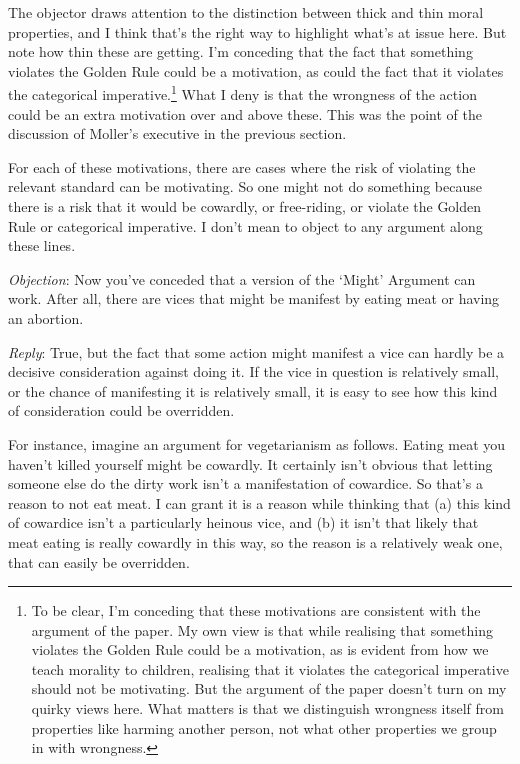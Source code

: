 \documentclass[
  10pt,
  letterpaper,
  DIV=11,
  numbers=noendperiod,
  twoside]{scrartcl}
\begin{document}
The objector draws attention to the distinction between thick and thin
moral properties, and I think that's the right way to highlight what's
at issue here. But note how thin these are getting. I'm conceding that
the fact that something violates the Golden Rule could be a motivation,
as could the fact that it violates the categorical
imperative.\footnote{To be clear, I'm conceding that these motivations
  are consistent with the argument of the paper. My own view is that
  while realising that something violates the Golden Rule could be a
  motivation, as is evident from how we teach morality to children,
  realising that it violates the categorical imperative should not be
  motivating. But the argument of the paper doesn't turn on my quirky
  views here. What matters is that we distinguish wrongness itself from
  properties like harming another person, not what other properties we
  group in with wrongness.} What I deny is that the wrongness of the
action could be an extra motivation over and above these. This was the
point of the discussion of Moller's executive in the previous section.

For each of these motivations, there are cases where the risk of
violating the relevant standard can be motivating. So one might not do
something because there is a risk that it would be cowardly, or
free-riding, or violate the Golden Rule or categorical imperative. I
don't mean to object to any argument along these lines.

\emph{Objection}: Now you've conceded that a version of the `Might'
Argument can work. After all, there are vices that might be manifest by
eating meat or having an abortion.

\emph{Reply}: True, but the fact that some action might manifest a vice
can hardly be a decisive consideration against doing it. If the vice in
question is relatively small, or the chance of manifesting it is
relatively small, it is easy to see how this kind of consideration could
be overridden.

For instance, imagine an argument for vegetarianism as follows. Eating
meat you haven't killed yourself might be cowardly. It certainly isn't
obvious that letting someone else do the dirty work isn't a
manifestation of cowardice. So that's a reason to not eat meat. I can
grant it is a reason while thinking that (a) this kind of cowardice
isn't a particularly heinous vice, and (b) it isn't that likely that
meat eating is really cowardly in this way, so the reason is a
relatively weak one, that can easily be overridden.
\end{document}
